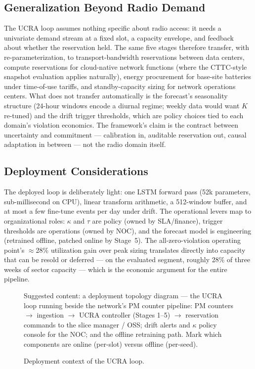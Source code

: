 \subsection{Generalization Beyond Radio Demand}

The UCRA loop assumes nothing specific about radio access: it needs
a univariate demand stream at a fixed slot, a capacity envelope, and
feedback about whether the reservation held. The same five stages
therefore transfer, with re-parameterization, to transport-bandwidth
reservations between data centers, compute reservations for
cloud-native network functions (where the CTTC-style snapshot
evaluation applies naturally), energy procurement for base-site
batteries under time-of-use tariffs, and standby-capacity sizing for
network operations centers. What does not transfer automatically is
the forecast's seasonality structure (24-hour windows encode a
diurnal regime; weekly data would want $K$ re-tuned) and the drift
trigger thresholds, which are policy choices tied to each domain's
violation economics. The framework's claim is the contract between
uncertainty and commitment --- calibration in, auditable reservation
out, causal adaptation in between --- not the radio domain
itself.

\subsection{Deployment Considerations}

The deployed loop is deliberately light: one LSTM forward pass
(52k parameters, sub-millisecond on CPU), linear transform
arithmetic, a 512-window buffer, and at most a few fine-tune events
per day under drift. The operational levers map to organizational
roles: $\kappa$ and $\tau$ are policy (owned by SLA/finance),
trigger thresholds are operations (owned by NOC), and the forecast
model is engineering (retrained offline, patched online by Stage~5).
The all-zero-violation operating point's $\approx$28\% utilization
gain over peak sizing translates directly into capacity that can be
resold or deferred --- on the evaluated segment, roughly 28\% of
three weeks of sector capacity --- which is the economic argument
for the entire pipeline.

\begin{figure}[!t]
\centering
{}
{Suggested content: a deployment topology diagram --- the UCRA loop
running beside the network's PM counter pipeline: PM counters
$\rightarrow$ ingestion $\rightarrow$ UCRA controller (Stages 1--5)
$\rightarrow$ reservation commands to the slice manager / OSS;
drift alerts and $\kappa$ policy console for the NOC; and the offline
retraining path. Mark which components are online (per-slot) versus
offline (per-seed).}
\caption{Deployment context of the UCRA loop.}
\label{fig:deployment}
\end{figure}
